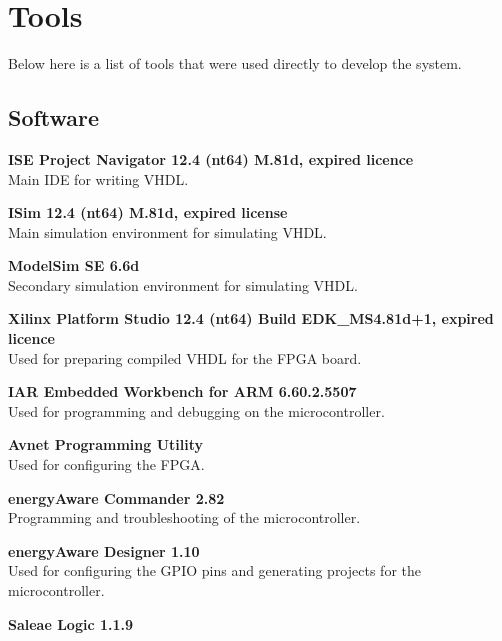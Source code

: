 \section{Tools}
Below here is a list of tools that were used directly to develop the system.


\subsection{Software}
\begin{description}
    \item{\textbf{ISE Project Navigator 12.4 (nt64) M.81d, expired licence}} \\
        Main IDE for writing VHDL.
    \item{\textbf{ISim 12.4 (nt64) M.81d, expired license}} \\
        Main simulation environment for simulating VHDL.
    \item{\textbf{ModelSim SE 6.6d}} \\
        Secondary simulation environment for simulating VHDL.
    \item{\textbf{Xilinx Platform Studio 12.4 (nt64) Build EDK\_MS4.81d+1, expired licence}} \\
        Used for preparing compiled VHDL for the FPGA board.
    \item{\textbf{IAR Embedded Workbench for ARM 6.60.2.5507}} \\
        Used for programming and debugging on the microcontroller.
    \item{\textbf{Avnet Programming Utility}} \\
        Used for configuring the FPGA.
    \item{\textbf{energyAware Commander 2.82}} \\
        Programming and troubleshooting of the microcontroller.
    \item{\textbf{energyAware Designer 1.10}} \\
        Used for configuring the GPIO pins and generating projects for the microcontroller.
    \item{\textbf{Saleae Logic 1.1.9}} \\

\end{description}
